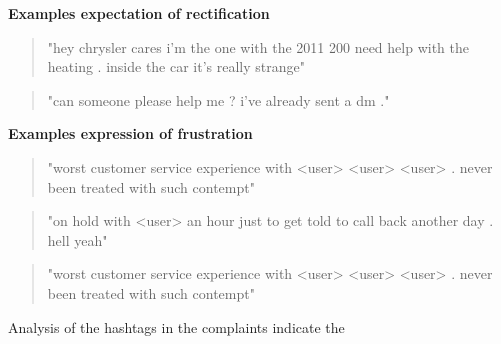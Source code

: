 \textbf{Examples expectation of rectification}
\begin{quote}
    "hey chrysler cares i'm the one with the 2011 200 need help with the heating . inside the car it's really strange"
\end{quote}
\begin{quote}
    "can someone please help me ? i've already sent a dm ."
\end{quote}
\textbf{Examples expression of frustration}
\begin{quote}
    "worst customer service experience with <user> <user> <user> . never been treated with such contempt"
\end{quote}
\begin{quote}
    "on hold with <user> an hour just to get told to call back another day . hell yeah"
\end{quote}
\begin{quote}
    "worst customer service experience with <user> <user> <user> . never been treated with such contempt"
\end{quote}

Analysis of the hashtags in the complaints indicate the 

